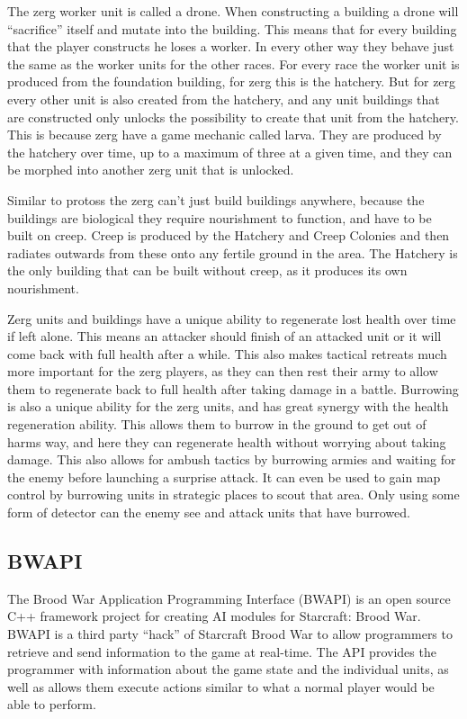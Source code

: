 The zerg worker unit is called a drone. When constructing a building a drone
will ``sacrifice'' itself and mutate into the building. This means that for
every building that the player constructs he loses a worker. In every other way
they behave just the same as the worker units for the other races. For every
race the worker unit is produced from the foundation building, for zerg this is
the hatchery. But for zerg every other unit is also created from the hatchery,
and any unit buildings that are constructed only unlocks the possibility to
create that unit from the hatchery. This is because zerg have a game mechanic
called larva. They are produced by the hatchery over time, up to a maximum of
three at a given time, and they can be morphed into another zerg unit that is
unlocked. 

Similar to protoss the zerg can't just build buildings anywhere, because the
buildings are biological they require nourishment to function, and have to be
built on creep. Creep is produced by the Hatchery and Creep Colonies and then
radiates outwards from these onto any fertile ground in the area. The Hatchery
is the only building that can be built without creep, as it produces its own
nourishment. 

Zerg units and buildings have a unique ability to regenerate lost health over
time if left alone. This means an attacker should finish of an attacked unit or
it will come back with full health after a while. This also makes tactical
retreats much more important for the zerg players, as they can then rest their
army to allow them to regenerate back to full health after taking damage in a
battle. Burrowing is also a unique ability for the zerg units, and has great
synergy with the health regeneration ability. This allows them to burrow in the
ground to get out of harms way, and here they can regenerate health without
worrying about taking damage. This also allows for ambush tactics by burrowing
armies and waiting for the enemy before launching a surprise attack. It can even
be used to gain map control by burrowing units in strategic places to scout that
area. Only using some form of detector can the enemy see and attack units that
have burrowed. 

\subsection{BWAPI}
The Brood War Application Programming Interface (BWAPI)\cite{bwapi} is an open source C++
framework project for creating AI modules for Starcraft: Brood War. BWAPI is a third party ``hack'' of Starcraft Brood War to allow programmers to retrieve and send information to the game at real-time. The API
provides the programmer with information about the game state and the individual
units, as well as allows them execute actions similar to what a normal player
would be able to perform. 

